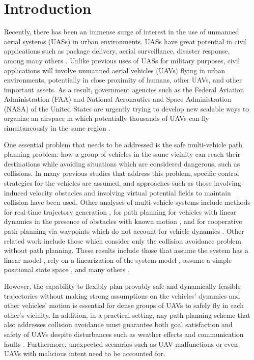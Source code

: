 \section{Introduction}
Recently, there has been an immense surge of interest in the use of unmanned aerial systems (UASs) in urban environments. UASs have great potential in civil applications such as package delivery, aerial surveillance, disaster response, among many others \cite{Tice91, Debusk10, Amazon16, AUVSI16, BBC16}. Unlike previous uses of UASs for military purposes, civil applications will involve unmanned aerial vehicles (UAVs) flying in urban environments, potentially in close proximity of humans, other UAVs, and other important assets. As a result, government agencies such as the Federal Aviation Administration (FAA) and National Aeronautics and Space Administration (NASA) of the United States are urgently trying to develop new scalable ways to organize an airspace in which potentially thousands of UAVs can fly simultaneously in the same region \cite{FAA13, Kopardekar16}.

One essential problem that needs to be addressed is the safe multi-vehicle path planning problem: how a group of vehicles in the same vicinity can reach their destinations while avoiding situations which are considered dangerous, such as collisions. In many previous studies that address this problem, specific control strategies for the vehicles are assumed, and approaches such as those involving induced velocity obstacles \cite{Fiorini98, Chasparis05, Vandenberg08,Wu2012} and involving virtual potential fields to maintain collision \cite{Olfati-Saber2002, Chuang07} have been used. Other analyses of multi-vehicle systems include methods for real-time trajectory generation \cite{Feng-LiLian2002}, for path planning for vehicles with linear dynamics in the presence of obstacles with known motion \cite{Ahmadzadeh2009}, and for cooperative path planning via waypoints which do not account for vehicle dynamics \cite{Bellingham}. Other related work include those which consider only the collision avoidance problem without path planning. These results include those that assume the system has a linear model \cite{Beard2003, Schouwenaars2004, Stipanovic2007}, rely on a linearization of the system model \cite{Massink2001, Althoff2011}, assume a simple positional state space \cite{Lin2015}, and many others \cite{Lalish2008, Hoffmann2008, Chen2016}.

However, the capability to flexibly plan provably safe and dynamically feasible trajectories without making strong assumptions on the vehicles' dynamics and other vehicles' motion is essential for dense groups of UAVs to safely fly in each other's vicinity. In addition, in a practical setting, any path planning scheme that also addresses collision avoidance must guarantee both goal satisfaction and safety of UAVs despite disturbances such as weather effects and communication faults \cite{Kopardekar16}. Furthermore, unexpected scenarios such as UAV malfunctions or even UAVs with malicious intent need to be accounted for.


